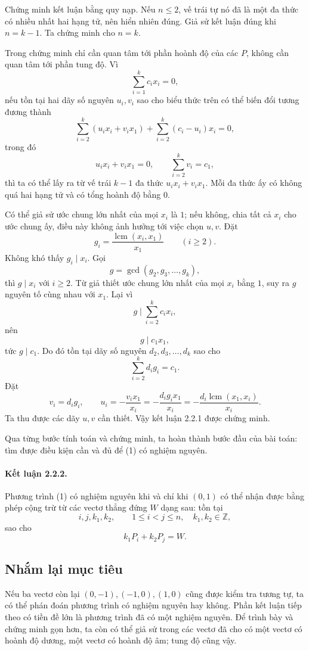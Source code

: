 \documentclass[11pt]{article}
\newcommand{\Z}{\mathbb{Z}}
\newcommand{\lcm}{\operatorname{lcm}}
\begin{document}
Chứng minh kết luận bằng quy nạp. Nếu \(n\le 2\), vế trái tự nó đã là một đa
thức có nhiều nhất hai hạng tử, nên hiển nhiên đúng. Giả sử kết luận đúng khi
\(n=k-1\). Ta chứng minh cho \(n=k\).

Trong chứng minh chỉ cần quan tâm tới phần hoành độ của các \(P\), không cần
quan tâm tới phần tung độ. Vì
\[
  \sum_{i=1}^{k} c_ix_i=0,
\]
nếu tồn tại hai dãy số nguyên \(u_i,v_i\) sao cho biểu thức trên có thể biến
đổi tương đương thành
\[
  \sum_{i=2}^{k}(u_ix_i+v_ix_1)+
  \sum_{i=2}^{k}(c_i-u_i)x_i=0,
\]
trong đó
\[
  u_ix_i+v_ix_1=0,\qquad \sum_{i=2}^{k}v_i=c_1,
\]
thì ta có thể lấy ra từ vế trái \(k-1\) đa thức \(u_ix_i+v_ix_1\). Mỗi đa
thức ấy có không quá hai hạng tử và có tổng hoành độ bằng \(0\).

Có thể giả sử ước chung lớn nhất của mọi \(x_i\) là \(1\); nếu không, chia tất
cả \(x_i\) cho ước chung ấy, điều này không ảnh hưởng tới việc chọn \(u,v\).
Đặt
\[
  g_i=\frac{\lcm(x_i,x_1)}{x_1}\qquad (i\ge 2).
\]
Không khó thấy \(g_i\mid x_i\). Gọi
\[
  g=\gcd(g_2,g_3,\ldots,g_k),
\]
thì \(g\mid x_i\) với \(i\ge 2\). Từ giả thiết ước chung lớn nhất của mọi
\(x_i\) bằng \(1\), suy ra \(g\) nguyên tố cùng nhau với \(x_1\). Lại vì
\[
  g\mid \sum_{i=2}^{k}c_ix_i,
\]
nên
\[
  g\mid c_1x_1,
\]
tức \(g\mid c_1\). Do đó tồn tại dãy số nguyên \(d_2,d_3,\ldots,d_k\) sao cho
\[
  \sum_{i=2}^{k}d_ig_i=c_1.
\]
Đặt
\[
  v_i=d_ig_i,\qquad
  u_i=-\frac{v_ix_1}{x_i}
     =-\frac{d_ig_ix_1}{x_i}
     =-\frac{d_i\lcm(x_1,x_i)}{x_i}.
\]
Ta thu được các dãy \(u,v\) cần thiết. Vậy kết luận 2.2.1 được chứng minh.

Qua từng bước tính toán và chứng minh, ta hoàn thành bước đầu của bài toán:
tìm được điều kiện cần và đủ để (1) có nghiệm nguyên.

\paragraph{Kết luận 2.2.2.}
Phương trình (1) có nghiệm nguyên khi và chỉ khi \((0,1)\) có thể nhận được
bằng phép cộng trừ từ các vectơ thẳng đứng \(W\) dạng sau: tồn tại
\[
  i,j,k_1,k_2,\qquad 1\le i<j\le n,\quad k_1,k_2\in\Z,
\]
sao cho
\[
  k_1P_i+k_2P_j=W.
\]

\subsection{Nhắm lại mục tiêu}

Nếu ba vectơ còn lại \((0,-1),(-1,0),(1,0)\) cũng được kiểm tra tương tự, ta
có thể phán đoán phương trình có nghiệm nguyên hay không. Phần kết luận tiếp
theo có tiền đề lớn là phương trình đã có một nghiệm nguyên. Để trình bày và
chứng minh gọn hơn, ta còn có thể giả sử trong các vectơ đã cho có một vectơ
có hoành độ dương, một vectơ có hoành độ âm; tung độ cũng vậy.
\end{document}
